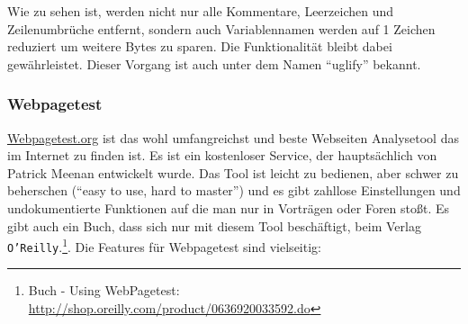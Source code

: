 			Wie zu sehen ist, werden nicht nur alle Kommentare, Leerzeichen und Zeilenumbrüche entfernt, sondern auch Variablennamen werden auf 1 Zeichen reduziert um weitere Bytes zu sparen. Die Funktionalität bleibt dabei gewährleistet. Dieser Vorgang ist auch unter dem Namen "`uglify"' bekannt.
		

		\subsubsection{Webpagetest} %
		\label{ssub:webpagetest}
			\url{Webpagetest.org} ist das wohl umfangreichst und beste Webseiten Analysetool das im Internet zu finden ist. Es ist ein kostenloser Service, der hauptsächlich von Patrick Meenan entwickelt wurde. Das Tool ist leicht zu bedienen, aber schwer zu beherschen ("`easy to use, hard to master"') und es gibt zahllose Einstellungen und undokumentierte Funktionen auf die man nur in Vorträgen oder Foren stoßt. Es gibt auch ein Buch, dass sich nur mit diesem Tool beschäftigt, beim Verlag \texttt{O'Reilly}.\footnote{Buch - Using WebPagetest: \url{http://shop.oreilly.com/product/0636920033592.do}}.	Die Features für Webpagetest sind vielseitig:

